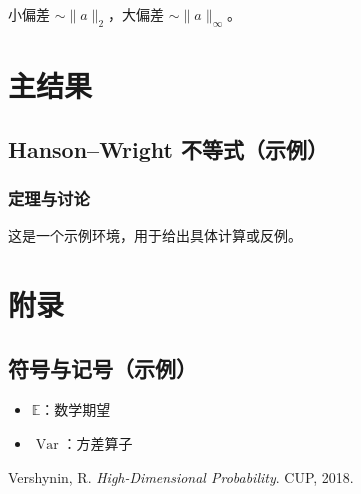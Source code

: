 \documentclass[10pt,openany]{book} %
\DeclareMathOperator{\Var}{Var}
\newcommand{\E}{\mathbb{E}}
\numberwithin{equation}{chapter}
\theoremstyle{plain}
\theoremstyle{definition}
\theoremstyle{remark}
\begin{document}
\begin{Takeaway}
小偏差 $\sim \|a\|_2$，大偏差 $\sim \|a\|_\infty$。
\end{Takeaway}

\part{主结果}
\chapter{Hanson--Wright 不等式（示例）}
\section{定理与讨论}
\begin{Example}
这是一个示例环境，用于给出具体计算或反例。
\end{Example}

\appendix
\part{附录}
\chapter{符号与记号（示例）}
\begin{itemize}
  \item \(\E\)：数学期望
  \item \(\Var\)：方差算子
\end{itemize}

\backmatter
\begin{thebibliography}{9}
Vershynin, R. \emph{High-Dimensional Probability}. CUP, 2018.
\end{thebibliography}
\end{document}
